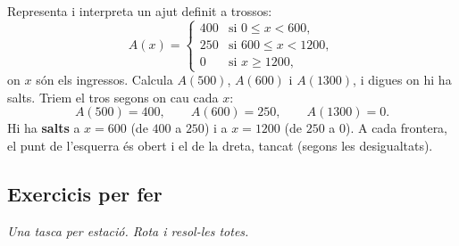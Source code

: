 \begin{exresolt}
Representa i interpreta un ajut definit a trossos:
\[
A(x)=
\begin{cases}
400 & \text{si } 0\le x<600,\\[2pt]
250 & \text{si } 600\le x<1200,\\[2pt]
0 & \text{si } x\ge 1200,
\end{cases}
\]
on $x$ són els ingressos. Calcula $A(500)$, $A(600)$ i $A(1300)$, i digues on hi ha
salts.
\solucio
Triem el tros segons on cau cada $x$:
\[
A(500)=400,\qquad A(600)=250,\qquad A(1300)=0.
\]
Hi ha \textbf{salts} a $x=600$ (de $400$ a $250$) i a $x=\num{1200}$ (de $250$ a $0$).
A cada frontera, el punt de l'esquerra és obert i el de la dreta, tancat (segons les
desigualtats).
\end{exresolt}

\subsection{Exercicis per fer}

\noindent\textit{Una tasca per estació. Rota i resol-les totes.}

